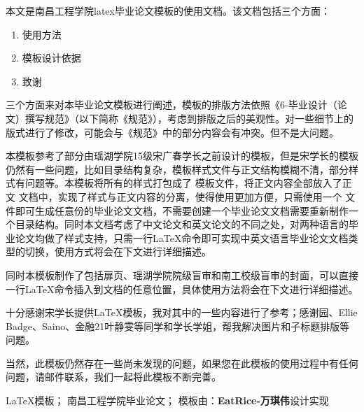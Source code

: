 \begin{CHAbstract}

    本文是南昌工程学院latex毕业论文模板的使用文档。该文档包括三个方面：
    
    \begin{enumerate}
        \item 使用方法
        \item 模板设计依据
        \item 致谢
    \end{enumerate}
    
    三个方面来对本毕业论文模板进行阐述，模板的排版方法依照《6-毕业设计（论文）撰写规范》（以下简称《规范》），考虑到排版之后的美观性。对一些细节上的版式进行了修改，可能会与《规范》中的部分内容会有冲突。但不是大问题。

    本模板参考了部分由瑶湖学院15级宋广春学长之前设计的模板，但是宋学长的模板仍然有一些问题，比如目录结构复杂，模板样式文件与正文结构模糊不清，部分样式有问题等。本模板将所有的样式打包成了 模板文件，将正文内容全部放入了正文 文档中，实现了样式与正文内容的分离，使得使用更加方便，只需使用一个 文件即可生成任意份的毕业论文文档，不需要创建一个毕业论文文档需要重新制作一个目录结构。同时本文档考虑了中文论文和英文论文的不同之处，对两种语言的毕业论文均做了样式支持，只需一行\LaTeX{}命令即可实现中英文语言毕业论文文档类型的切换，使用方式将会在下文进行详细描述。
    
    同时本模板制作了包括扉页、瑶湖学院院级盲审和南工校级盲审的封面，可以直接一行\LaTeX{}命令插入到文档的任意位置，具体使用方法将会在下文进行详细描述。

    十分感谢宋学长提供\LaTeX{}模板，我对其中的一些内容进行了参考；感谢园、Ellie Badge、Saino、金融21叶静雯等同学和学长学姐，帮我解决图片和子标题排版等问题。

    当然，此模板仍然存在一些尚未发现的问题，如果您在此模板的使用过程中有任何问题，请邮件联系，我们一起将此模板不断完善。

\end{CHAbstract}


\begin{CHKeyWords}
\LaTeX 模板；
南昌工程学院毕业论文；
模板由：\textbf{EatRice-万琪伟}设计实现
\end{CHKeyWords}